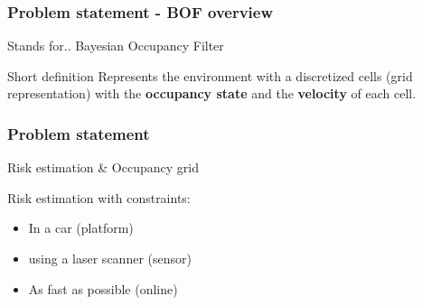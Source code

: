 \documentclass{beamer}
\begin{document}
\begin{frame}
		
				
				
	\end{frame}
	
	\begin{frame}
		\frametitle{Problem statement - BOF overview}
		
		\begin{block}{Stands for..}
			Bayesian Occupancy Filter
		\end{block}
		
		\begin{block}{Short definition}
			 Represents the environment with a discretized cells (grid representation) with the \textbf{occupancy state} and the \textbf{velocity} of each cell.
		\end{block}
	\end{frame}

	\begin{frame}
		\frametitle{Problem statement}
		Risk estimation \& Occupancy grid	
		
		Risk estimation with constraints:
		\begin{itemize}
			\item In a car (platform)
			\item using a laser scanner (sensor)
			\item As fast as possible (online)
		\end{itemize}		
		
	\end{frame}
	
\end{document}
